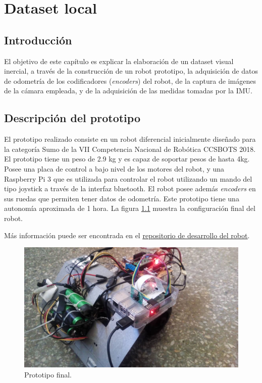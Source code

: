 \chapter{Dataset local}
\label{capitulo5}


\section{Introducción}
El objetivo de este capítulo es explicar la elaboración de un dataset visual inercial, a través de la construcción de un robot prototipo, la adquisición de datos de odometría de los codificadores (\textit{encoders}) del robot, de la captura de imágenes de la cámara empleada, y de la adquisición de las medidas tomadas por la IMU.


\clearpage

\section{Descripción del prototipo}

El prototipo realizado consiste en un robot diferencial inicialmente diseñado para la categoría Sumo de la VII Competencia Nacional de Robótica CCSBOTS 2018. El prototipo tiene un peso de 2.9 kg y es capaz de soportar pesos de hasta 4kg. Posee una placa de control a bajo nivel de los motores del robot, y una Raspberry Pi 3 que es utilizada para controlar el robot utilizando un mando del tipo joystick a través de la interfaz bluetooth. El robot posee además \textit{encoders} en sus ruedas que permiten tener datos de odometría. Este prototipo tiene una autonomía aproximada de 1 hora. La figura \ref{imagen:Robot} muestra la configuración final del robot. 

Más información puede ser encontrada en el \href{https://github.com/Robot-Sumo/}{\underline{repositorio de desarrollo del robot}}.


\begin{figure}[H]
	\centering		\includegraphics[width=0.7\linewidth]{imagenes/prototipo/Robot}
	\caption[Prototipo final]{Prototipo final.}
	\label{imagen:Robot}
\end{figure}


